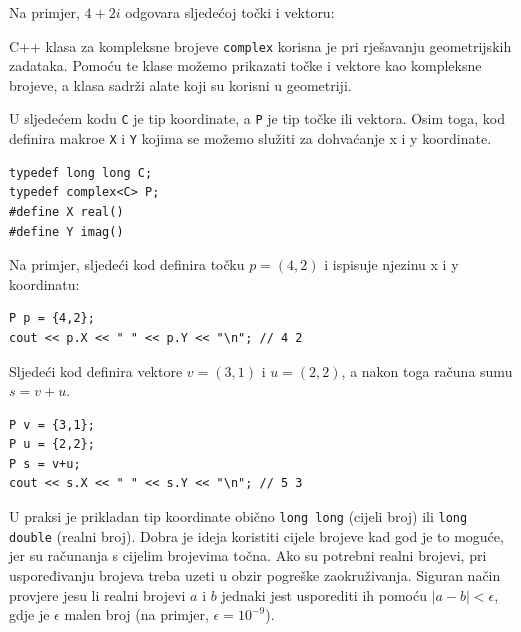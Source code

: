 Na primjer, $4+2i$ odgovara
sljedećoj točki i vektoru:

\begin{center}
\end{center}


C++ klasa za kompleksne brojeve \texttt{complex}
korisna je pri rješavanju geometrijskih zadataka.
Pomoću te klase možemo prikazati točke i vektore
kao kompleksne brojeve, a klasa sadrži alate
koji su korisni u geometriji.

U sljedećem kodu \texttt{C} je tip
koordinate, a \texttt{P} je tip točke ili vektora.
Osim toga, kod definira makroe \texttt{X} i \texttt{Y}
kojima se možemo služiti za dohvaćanje x i y koordinate.

\begin{lstlisting}
typedef long long C;
typedef complex<C> P;
#define X real()
#define Y imag()
\end{lstlisting}

Na primjer, sljedeći kod definira točku $p=(4,2)$
i ispisuje njezinu x i y koordinatu:

\begin{lstlisting}
P p = {4,2};
cout << p.X << " " << p.Y << "\n"; // 4 2
\end{lstlisting}

Sljedeći kod definira vektore $v=(3,1)$ i $u=(2,2)$,
a nakon toga računa sumu $s=v+u$.

\begin{lstlisting}
P v = {3,1};
P u = {2,2};
P s = v+u;
cout << s.X << " " << s.Y << "\n"; // 5 3
\end{lstlisting}

U praksi je
prikladan tip koordinate obično
\texttt{long long} (cijeli broj) ili \texttt{long double}
(realni broj).
Dobra je ideja koristiti cijele brojeve kad god je to moguće,
jer su računanja s cijelim brojevima točna.
Ako su potrebni realni brojevi,
pri uspoređivanju brojeva treba uzeti u obzir
pogreške zaokruživanja.
Siguran način provjere jesu li realni brojevi $a$ i $b$ jednaki
jest usporediti ih pomoću $|a-b|<\epsilon$,
gdje je $\epsilon$ malen broj (na primjer, $\epsilon=10^{-9}$).

